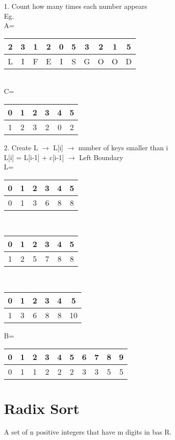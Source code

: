 \documentclass[12pt]{article}
\begin{document}
	1. Count how many times each number appears\\
	
	Eg. \\
	A=
	\begin{tabular}{| c | c | c | c | c | c | c | c | c | c|}
		\hline
		2 & 3 & 1 & 2 & 0 & 5 & 3 & 2 & 1 & 5 \\ \hline
		L & I & F & E & I & S & G & O & O & D \\ \hline
	\end{tabular}
	\\
	C= 
	\begin{tabular}{| c | c | c | c | c | c |}
		\hline
		0 & 1 & 2 & 3 & 4 & 5  \\ \hline
		1 & 2 & 3 & 2 & 0 & 2 \\ \hline
	\end{tabular}
	
	2. Create L $\rightarrow$ L[i] $\rightarrow$ number of keys smaller than i\\
	L[i] = L[i-1] + c[i-1] $\rightarrow$ Left Boundary\\
	L=
	\begin{tabular}{| c | c | c | c | c | c |}
		\hline
		0 & 1 & 2 & 3 & 4 & 5  \\ \hline
		0 & 1 & 3 & 6 & 8 & 8 \\ \hline
	\end{tabular}\\
	\begin{tabular}{| c | c | c | c | c | c |}
		\hline
		0 & 1 & 2 & 3 & 4 & 5  \\ \hline
		1 & 2 & 5 & 7 & 8 & 8 \\ \hline
	\end{tabular}\\
	\begin{tabular}{| c | c | c | c | c | c |}
		\hline
		0 & 1 & 2 & 3 & 4 & 5  \\ \hline
		1 & 3 & 6 & 8 & 8 & 10 \\ \hline
	\end{tabular}
	
	B= 
	\begin{tabular}{| c | c | c | c | c | c | c | c | c | c |}
		\hline
		0 & 1 & 2 & 3 & 4 & 5 & 6 & 7 & 8 & 9 \\ \hline
		0 & 1 & 1 & 2 & 2 & 2 & 3 & 3 & 5 & 5  \\ \hline
	\end{tabular}
	
	\section*{Radix Sort}
	A set of n positive integers that have m digits in bas R.\\
	
\end{document}
